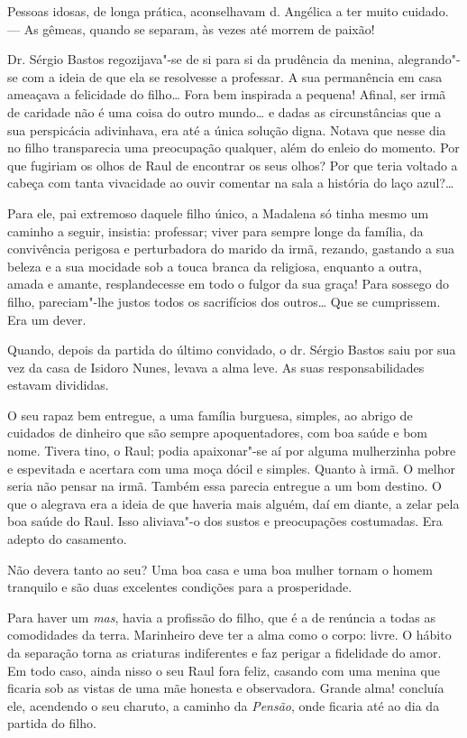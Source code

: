 Pessoas idosas, de longa prática, aconselhavam d. Angélica a ter muito
cuidado. --- As gêmeas, quando se separam, às vezes até morrem de
paixão!

Dr. Sérgio Bastos regozijava"-se de si para si da prudência da menina,
alegrando"-se com a ideia de que ela se resolvesse a professar. A sua
permanência em casa ameaçava a felicidade do filho\ldots{} Fora bem inspirada
a pequena! Afinal, ser irmã de caridade não é uma coisa do outro
mundo\ldots{} e dadas as circunstâncias que a sua perspicácia adivinhava, era
até a única solução digna. Notava que nesse dia no filho transparecia
uma preocupação qualquer, além do enleio do momento. Por que fugiriam os
olhos de Raul de encontrar os seus olhos? Por que teria voltado a cabeça
com tanta vivacidade ao ouvir comentar na sala a história do laço
azul?\ldots{}

Para ele, pai extremoso daquele filho único, a Madalena só tinha mesmo
um caminho a seguir, insistia: professar; viver para sempre longe da
família, da convivência perigosa e perturbadora do marido da irmã,
rezando, gastando a sua beleza e a sua mocidade sob a touca branca da
religiosa, enquanto a outra, amada e amante, resplandecesse em todo o
fulgor da sua graça! Para sossego do filho, pareciam"-lhe justos todos os
sacrifícios dos outros\ldots{} Que se cumprissem. Era um dever.

Quando, depois da partida do último convidado, o dr. Sérgio Bastos saiu
por sua vez da casa de Isidoro Nunes, levava a alma leve. As suas
responsabilidades estavam divididas.

O seu rapaz bem entregue, a uma família burguesa, simples, ao abrigo de
cuidados de dinheiro que são sempre apoquentadores, com boa saúde e bom
nome. Tivera tino, o Raul; podia apaixonar"-se aí por alguma mulherzinha
pobre e espevitada e acertara com uma moça dócil e simples. Quanto à
irmã. O melhor seria não pensar na irmã. Também essa parecia entregue a
um bom destino. O que o alegrava era a ideia de que haveria mais alguém,
daí em diante, a zelar pela boa saúde do Raul. Isso aliviava"-o dos
sustos e preocupações costumadas. Era adepto do casamento.

Não devera tanto ao seu? Uma boa casa e uma boa mulher tornam o homem
tranquilo e são duas excelentes condições para a prosperidade.

Para haver um \emph{mas}, havia a profissão do filho, que é a de
renúncia a todas as comodidades da terra. Marinheiro deve ter a alma
como o corpo: livre. O hábito da separação torna as criaturas
indiferentes e faz perigar a fidelidade do amor. Em todo caso, ainda
nisso o seu Raul fora feliz, casando com uma menina que ficaria sob as
vistas de uma mãe honesta e observadora. Grande alma! concluía ele,
acendendo o seu charuto, a caminho da \emph{Pensão}, onde ficaria até ao
dia da partida do filho.

